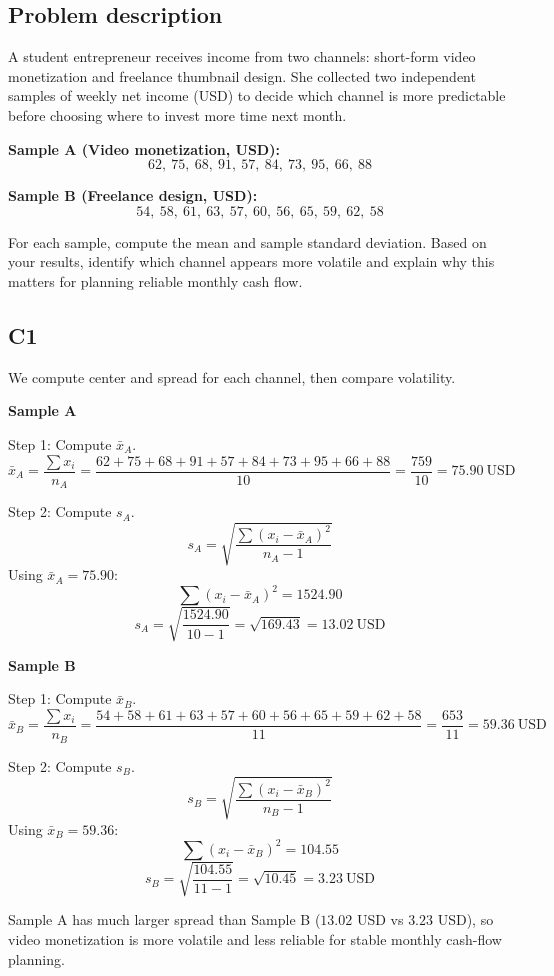 \begin{ExamProblems}
		\subsection*{Problem description}
		A student entrepreneur receives income from two channels: short-form video monetization and freelance thumbnail design. She collected two independent samples of weekly net income (USD) to decide which channel is more predictable before choosing where to invest more time next month.

		\textbf{Sample A (Video monetization, USD):}
		\[62,\ 75,\ 68,\ 91,\ 57,\ 84,\ 73,\ 95,\ 66,\ 88\]

		\textbf{Sample B (Freelance design, USD):}
		\[54,\ 58,\ 61,\ 63,\ 57,\ 60,\ 56,\ 65,\ 59,\ 62,\ 58\]

		For each sample, compute the mean and sample standard deviation. Based on your results, identify which channel appears more volatile and explain why this matters for planning reliable monthly cash flow.

		\subsection*{C1}
		We compute center and spread for each channel, then compare volatility.

		\textbf{Sample A}

		Step 1: Compute $\bar{x}_A$.
		\[
		\bar{x}_A = \frac{\sum x_i}{n_A}
		= \frac{62+75+68+91+57+84+73+95+66+88}{10}
		= \frac{759}{10}
		= 75.90\ \text{USD}
		\]

		Step 2: Compute $s_A$.
		\[
		s_A = \sqrt{\frac{\sum (x_i-\bar{x}_A)^2}{n_A-1}}
		\]
		Using $\bar{x}_A=75.90$:
		\[
		\sum (x_i-\bar{x}_A)^2 = 1524.90
		\]
		\[
		s_A = \sqrt{\frac{1524.90}{10-1}} = \sqrt{169.43} = 13.02\ \text{USD}
		\]

		\textbf{Sample B}

		Step 1: Compute $\bar{x}_B$.
		\[
		\bar{x}_B = \frac{\sum x_i}{n_B}
		= \frac{54+58+61+63+57+60+56+65+59+62+58}{11}
		= \frac{653}{11}
		= 59.36\ \text{USD}
		\]

		Step 2: Compute $s_B$.
		\[
		s_B = \sqrt{\frac{\sum (x_i-\bar{x}_B)^2}{n_B-1}}
		\]
		Using $\bar{x}_B=59.36$:
		\[
		\sum (x_i-\bar{x}_B)^2 = 104.55
		\]
		\[
		s_B = \sqrt{\frac{104.55}{11-1}} = \sqrt{10.45} = 3.23\ \text{USD}
		\]

		Sample A has much larger spread than Sample B ($13.02$ USD vs $3.23$ USD), so video monetization is more volatile and less reliable for stable monthly cash-flow planning.


\end{ExamProblems}
